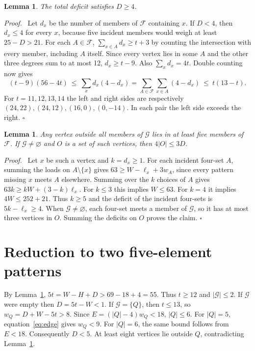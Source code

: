 \documentclass[11pt]{article}
\newtheorem{lemma}[theorem]{Lemma}
\newenvironment{proof}{\par\noindent\textit{Proof.}\ }{\hfill\(\square\)\par}
\newcommand{\F}{\mathcal F}
\newcommand{\G}{\mathcal G}
\begin{document}
\begin{lemma}\label{lem:small}
The total deficit satisfies \(D\ge4\).
\end{lemma}
\begin{proof}
Let \(d_x\) be the number of members of \(\F\) containing \(x\).
If \(D<4\), then \(d_x\le4\) for every \(x\), because five incident
members would weigh at least \(25-D>21\). For each \(A\in\F\),
\(\sum_{x\in A} d_x\ge t+3\) by counting the intersection with every
member, including \(A\) itself. Since every vertex lies in some \(A\)
and the other three degrees sum to at most 12, \(d_x\ge t-9\).
Also \(\sum_xd_x=4t\). Double counting now gives
\[
(t-9)(56-4t)\ \le\ \sum_x d_x(4-d_x)
=\sum_{A\in\F}\sum_{x\in A}(4-d_x)\ \le\ t(13-t).
\]
For \(t=11,12,13,14\) the left and right sides are respectively
\((24,22),(24,12),(16,0),(0,-14)\). In each pair the left side exceeds the right.
\end{proof}

\begin{lemma}\label{lem:outside}
Any vertex outside all members of \(\G\) lies in at least five members
of \(\F\). If \(\G\ne\varnothing\) and \(O\) is a set of such vertices,
then \(4|O|\le 3D\).
\end{lemma}
\begin{proof}
Let \(x\) be such a vertex and \(k=d_x\ge1\). For each incident four-set
\(A\), summing the loads on \(A\setminus\{x\}\) gives
\(63\ge W-\ell_x+3w_A\), since every pattern missing \(x\) meets
\(A\) elsewhere. Summing over the \(k\) choices of \(A\) gives
\(63k\ge kW+(3-k)\ell_x\). For \(k\le3\) this implies \(W\le63\).
For \(k=4\) it implies \(4W\le252+21\). Thus \(k\ge5\) and the
deficit of the incident four-sets is \(5k-\ell_x\ge4\).
When \(\G\ne\varnothing\), each four-set meets a member of \(\G\), so it has at most three vertices
in \(O\). Summing the deficits on \(O\) proves the claim.
\end{proof}

\section{Reduction to two five-element patterns}
By Lemma~\ref{lem:small}, \(5t=W-H+D>69-18+4=55\).
Thus \(t\ge12\) and \(|\G|\le2\). If \(\G\) were empty then
\(D=5t-W<1\). If \(\G=\{Q\}\), then \(t\le13\), so
\(w_Q=D+W-5t>8\). Since \(E=(|Q|-4)w_Q<18\), \(|Q|\le6\).
For \(|Q|=5\), equation~\eqref{eq:edge} gives \(w_Q<9\). For
\(|Q|=6\), the same bound follows from \(E<18\). Consequently \(D<5\).
At least eight vertices lie outside \(Q\), contradicting
Lemma~\ref{lem:outside}.
\end{document}

